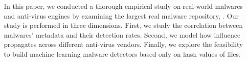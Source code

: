 In this paper, we conducted a thorough empirical study on real-world malwares and anti-virus 
engines by examining the largest real malware repository, \vt. 
Our study is performed in three dimensions.
First, we study the correlation between malwares’ metadata and their detection rates. 
Second, we model how influence propagates across different anti-virus vendors. 
Finally, we explore the feasibility to build machine learning malware detectors based only on hash values of files.

